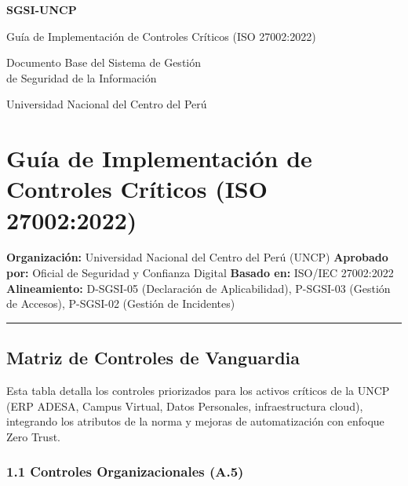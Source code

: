 \documentclass[10pt,letterpaper]{article}
\newcommand{\makecover}{
\begin{titlepage}
\centering
\vspace*{2cm}
{\Huge\bfseries\color{uncpblue} SGSI-UNCP\par}
\vspace{0.7cm}
{\LARGE Guía de Implementación de Controles Críticos (ISO
27002:2022)\par}
\vspace{0.5cm}
{\large Documento Base del Sistema de Gestión\\de Seguridad de la Información\par}
\vspace{1.5cm}
{\small Universidad Nacional del Centro del Perú\par}
\vfill
\end{titlepage}
}
\begin{document}
\makecover
\setcounter{tocdepth}{2}
\RaggedRight
\tableofcontents
\newpage

\RaggedRight
\section{Guía de Implementación de Controles Críticos (ISO
27002:2022)}\label{guuxeda-de-implementaciuxf3n-de-controles-cruxedticos-iso-270022022}

\textbf{Organización:} Universidad Nacional del Centro del Perú (UNCP)
\textbf{Aprobado por:} Oficial de Seguridad y Confianza Digital
\textbf{Basado en:} ISO/IEC 27002:2022 \textbf{Alineamiento:} D-SGSI-05
(Declaración de Aplicabilidad), P-SGSI-03 (Gestión de Accesos),
P-SGSI-02 (Gestión de Incidentes)

\begin{center}\rule{0.5\linewidth}{0.5pt}\end{center}

\subsection{Matriz de Controles de
Vanguardia}\label{matriz-de-controles-de-vanguardia}

Esta tabla detalla los controles priorizados para los activos críticos
de la UNCP (ERP ADESA, Campus Virtual, Datos Personales, infraestructura
cloud), integrando los atributos de la norma y mejoras de automatización
con enfoque Zero Trust.

\subsubsection{1.1 Controles Organizacionales
(A.5)}\label{controles-organizacionales-a.5}
\end{document}
